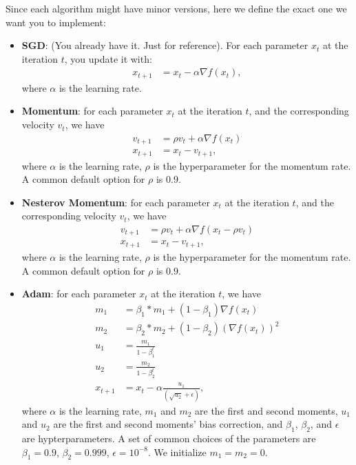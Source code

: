 \noindent Since each algorithm might have minor versions, here we define the exact one we want you to implement:
\begin{itemize}
\item \textbf{SGD}: (You already have it. Just for reference). For each parameter $x_t$ at the iteration $t$, you update it with:
\begin{align}
x_{t+1} &= x_t - \alpha \nabla f(x_t),
\end{align}
where $\alpha$ is the learning rate.

\item \textbf{Momentum}: for each parameter $x_t$ at the iteration $t$, and the corresponding velocity $v_t$, we have
\begin{align}
v_{t+1} &= \rho v_t + \alpha \nabla f(x_t) \\
x_{t+1} &= x_t -  v_{t+1},
\end{align}
where $\alpha$ is the learning rate, $\rho$ is the hyperparameter for the momentum rate. A common default option for $\rho$ is $0.9$.

\item \textbf{Nesterov Momentum}: for each parameter $x_t$ at the iteration $t$, and the corresponding velocity $v_t$, we have
\begin{align}
v_{t+1} &= \rho v_t + \alpha  \nabla f(x_t - \rho v_t) \\
x_{t+1} &= x_t - v_{t+1},
\end{align}
where $\alpha$ is the learning rate, $\rho$ is the hyperparameter for the momentum rate. A common default option for $\rho$ is $0.9$.

\item \textbf{Adam}: for each parameter $x_t$ at the iteration $t$, we have
\begin{align}
m_1 &= \beta_1 * m_1 + (1-\beta_1) \nabla f(x_t) \\
m_2 &= \beta_2 * m_2 + (1-\beta_2) (\nabla f(x_t))^2 \\
u_1 &= \frac{m_1}{1 - \beta_1^t} \\
u_2 &= \frac{m_2}{1 - \beta_2^t} \\
x_{t+1} &= x_t - \alpha \frac{u_1}{(\sqrt{u_2} + \epsilon)} ,
\end{align}
where $\alpha$ is the learning rate, $m_1$ and $m_2$ are the first and second moments, $u_1$ and $u_2$ are the first and second moments' bias  correction, and $\beta_1$, $\beta_2$, and $\epsilon$ are hypterparameters. A set of common choices of the parameters are $\beta_1 = 0.9$, $\beta_2 = 0.999$, $\epsilon = 10^{-8}$. We initialize $m_1 = m_2 = 0$.

\end{itemize}

